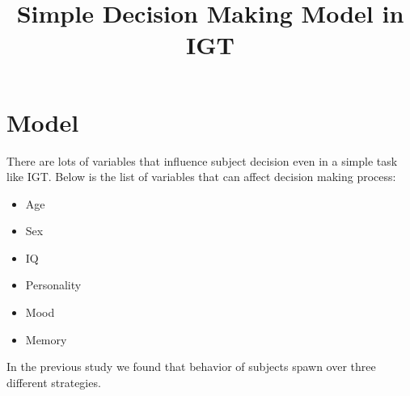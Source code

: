 \documentclass[12pt]{report}
\title{Simple Decision Making Model in IGT}
\author{}
\begin{document}
\maketitle
\section{Model}
There are lots of variables that influence subject decision even in a simple task like IGT.
Below is the list of variables that can affect decision making process:
\begin{itemize}
	\item Age
	\item Sex
	\item IQ
	\item Personality
	\item Mood
	\item Memory
\end{itemize}

In the previous study we found that behavior of subjects spawn over three different strategies.
\end{document}
